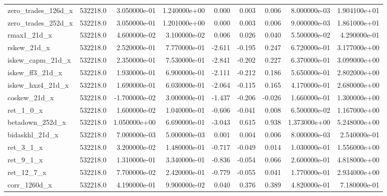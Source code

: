 \documentclass[12pt]{article}
\begin{document}
\begin{landscape}
\begin{longtable}{|l|r|r|r|r|r|r|r|r|}
		zero\_trades\_126d\_x    & 532218.0 & 3.050000e-01  & 1.240000e+00 & 0.000      & 0.003       & 0.006       & 8.000000e-03  & 1.904100e+01 \\
		zero\_trades\_252d\_x    & 532218.0 & 3.050000e-01  & 1.201000e+00 & 0.000      & 0.003       & 0.006       & 9.000000e-03  & 1.861000e+01 \\
		rmax1\_21d\_x            & 532218.0 & 4.600000e-02  & 3.100000e-02 & 0.006      & 0.026       & 0.040       & 5.500000e-02  & 4.290000e-01 \\
		rskew\_21d\_x            & 532218.0 & 2.520000e-01  & 7.770000e-01 & -2.611     & -0.195      & 0.247       & 6.720000e-01  & 3.177000e+00 \\
		iskew\_capm\_21d\_x      & 532218.0 & 2.350000e-01  & 7.530000e-01 & -2.841     & -0.202      & 0.227       & 6.370000e-01  & 3.099000e+00 \\
		iskew\_ff3\_21d\_x       & 532218.0 & 1.930000e-01  & 6.900000e-01 & -2.111     & -0.212      & 0.186       & 5.650000e-01  & 2.802000e+00 \\
		iskew\_hxz4\_21d\_x      & 532218.0 & 1.690000e-01  & 6.030000e-01 & -2.064     & -0.115      & 0.165       & 4.170000e-01  & 2.680000e+00 \\
		coskew\_21d\_x           & 532218.0 & -1.700000e-02 & 3.000000e-01 & -1.437     & -0.206      & -0.026      & 1.660000e-01  & 1.300000e+00 \\
		ret\_1\_0\_x             & 532218.0 & 1.600000e-02  & 1.040000e-01 & -0.606     & -0.041      & 0.008       & 6.500000e-02  & 1.167000e+00 \\
		betadown\_252d\_x        & 532218.0 & 1.050000e+00  & 6.690000e-01 & -3.043     & 0.615       & 0.938       & 1.373000e+00  & 5.248000e+00 \\
		bidaskhl\_21d\_x         & 532218.0 & 7.000000e-03  & 5.000000e-03 & 0.001      & 0.004       & 0.006       & 8.000000e-03  & 2.540000e-01 \\
		ret\_3\_1\_x             & 532218.0 & 3.200000e-02  & 1.480000e-01 & -0.717     & -0.049      & 0.014       & 1.030000e-01  & 1.556000e+00 \\
		ret\_9\_1\_x             & 532218.0 & 1.310000e-01  & 3.340000e-01 & -0.836     & -0.054      & 0.066       & 2.600000e-01  & 4.818000e+00 \\
		ret\_12\_7\_x            & 532218.0 & 7.700000e-02  & 2.420000e-01 & -0.779     & -0.055      & 0.041       & 1.770000e-01  & 2.934000e+00 \\
		corr\_1260d\_x           & 532218.0 & 4.190000e-01  & 9.900000e-02 & 0.040      & 0.376       & 0.389       & 4.820000e-01  & 7.180000e-01 \\

\end{longtable}
\end{landscape}
\end{document}
